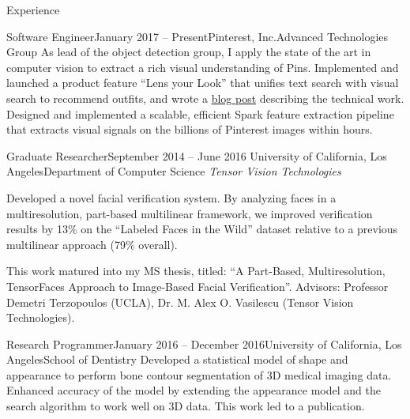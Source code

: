 \documentclass{resume}
\begin{document}
\vspace{-0.5em}

\begin{component}{Experience}
    \begin{position}{Software Engineer}{January 2017 -- Present}{Pinterest, Inc.}{Advanced Technologies Group}
    {As lead of the object detection group, I apply the state of the art in computer vision to extract a rich visual understanding of Pins. Implemented and launched a product feature ``Lens your Look'' that unifies text search with visual search to recommend outfits, and wrote a \href{https://medium.com/@Pinterest_Engineering/building-lens-your-look-unifying-text-and-camera-search-1b2f3ef4e393}{blog post} describing the technical work.
      Designed and implemented a scalable, efficient Spark feature extraction pipeline that extracts visual signals on the billions of Pinterest images within hours.}
  \end{position}
  
    \begin{position}{Graduate Researcher}{September 2014 -- June 2016}
        {University of California, Los Angeles}{Department of Computer Science}
    \emph{Tensor Vision Technologies}

    {Developed a novel facial verification system. 
By analyzing faces in a multiresolution, part-based multilinear framework, we improved verification results by 13\% on the ``Labeled Faces in the Wild'' dataset relative to a previous multilinear approach (79\% overall).

This work matured into my MS thesis, titled: ``A Part-Based, Multiresolution, TensorFaces Approach to Image-Based Facial Verification''.
Advisors: Professor Demetri Terzopoulos (UCLA), Dr. M. Alex O. Vasilescu (Tensor Vision Technologies).
}
    \end{position}

    \begin{position}{Research Programmer}{January 2016 -- December 2016}{University of California, Los Angeles}{School of Dentistry}
      {
Developed a statistical model of shape and appearance to perform bone contour segmentation of 3D medical imaging data.
Enhanced accuracy of the model by extending the appearance model and the search algorithm to work well on 3D data.
This work led to a publication.
}
      \end{position}



\end{component}
\end{document}
